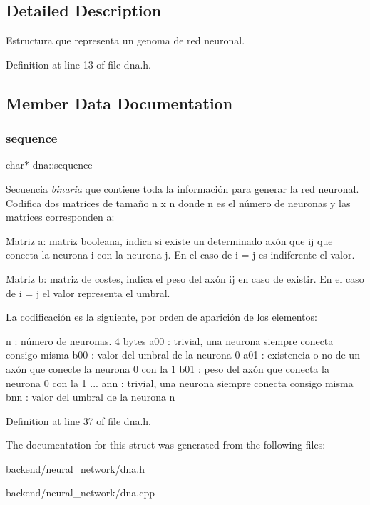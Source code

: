 \subsection{Detailed Description}
Estructura que representa un genoma de red neuronal. 

Definition at line 13 of file dna.\+h.



\subsection{Member Data Documentation}
\mbox{\label{structdna_aed2989af9e06a398429aca34de0d3b3f}} 
\subsubsection{\texorpdfstring{sequence}{sequence}}
{\footnotesize\ttfamily char$\ast$ dna\+::sequence}



Secuencia {\itshape binaria} que contiene toda la información para generar la red neuronal. Codifica dos matrices de tamaño n x n donde n es el número de neuronas y las matrices corresponden a\+: 

Matriz a\+: matriz booleana, indica si existe un determinado axón que ij que conecta la neurona i con la neurona j. En el caso de i = j es indiferente el valor.

Matriz b\+: matriz de costes, indica el peso del axón ij en caso de existir. En el caso de i = j el valor representa el umbral.

La codificación es la siguiente, por orden de aparición de los elementos\+:

n \+: número de neuronas. 4 bytes a00 \+: trivial, una neurona siempre conecta consigo misma b00 \+: valor del umbral de la neurona 0 a01 \+: existencia o no de un axón que conecte la neurona 0 con la 1 b01 \+: peso del axón que conecta la neurona 0 con la 1 ... ann \+: trivial, una neurona siempre conecta consigo misma bnn \+: valor del umbral de la neurona n 

Definition at line 37 of file dna.\+h.



The documentation for this struct was generated from the following files\+:\begin{DoxyCompactItemize}
\item 
backend/neural\+\_\+network/dna.\+h\item 
backend/neural\+\_\+network/dna.\+cpp\end{DoxyCompactItemize}
